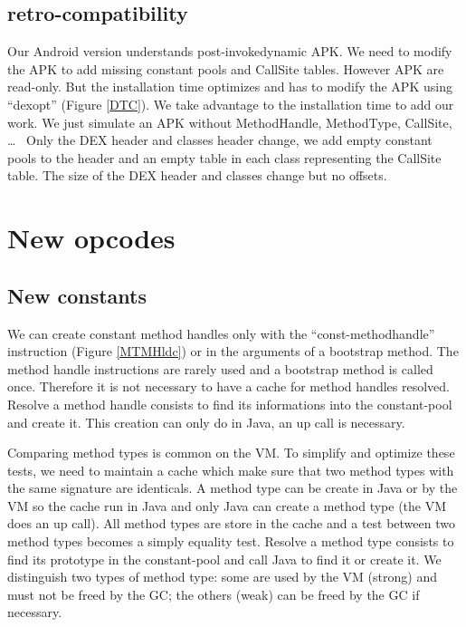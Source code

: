 \documentclass{sig-alternate}
\def \ANDROID{Android\xspace}
\begin{document}
  \subsection{retro-compatibility}
    Our \ANDROID version understands post-invokedynamic APK.
    We need to modify the APK to add missing constant pools and CallSite tables.
    However APK are read-only.
    But the installation time optimizes and has to modify the APK using ``dexopt'' (Figure \ref{DTC}).
    We take advantage to the installation time to add our work.
    We just simulate an APK without MethodHandle, MethodType, CallSite, \dots~%
    Only the DEX header and classes header change, we add empty constant pools to the header
    and an empty table in each class representing the CallSite table.
    The size of the DEX header and classes change but no offsets.

\section{New opcodes}
\label{newConst}
  \subsection{New constants}

    We can create constant method handles only with the ``const-methodhandle'' instruction (Figure \ref{MTMHldc}) or in the arguments of a bootstrap method.
    The method handle instructions are rarely used and a bootstrap method is called once.
    Therefore it is not necessary to have a cache for method handles resolved.
    Resolve a method handle consists to find its informations into the constant-pool and create it.
    This creation can only do in Java, an up call is necessary.

    Comparing method types is common on the VM.
    To simplify and optimize these tests, we need to maintain a cache which make sure that two method types with the same signature are identicals.
    A method type can be create in Java or by the VM so the cache run in Java and only Java can create a method type (the VM does an up call).
    All method types are store in the cache and a test between two method types becomes a simply equality test.
    Resolve a method type consists to find its prototype in the constant-pool and call Java to find it or create it.
    We distinguish two types of method type: some are used by the VM (strong) and must not be freed by the GC; the others (weak) can be freed by the GC if necessary.
\end{document}
